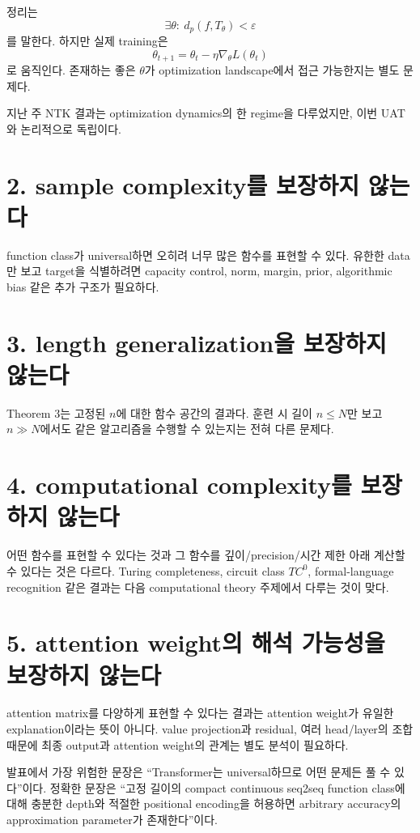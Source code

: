 \documentclass[11pt,a4paper,oneside,openany]{memoir}
\theoremstyle{definition}
\begin{document}
정리는
\[
\exists\theta:\ d_p(f,T_\theta)<\varepsilon
\]
를 말한다. 하지만 실제 training은
\[
\theta_{t+1}=\theta_t-\eta\nabla_\theta L(\theta_t)
\]
로 움직인다. 존재하는 좋은 $\theta$가 optimization landscape에서 접근 가능한지는 별도 문제다.

지난 주 NTK 결과는 optimization dynamics의 한 regime을 다루었지만, 이번 UAT와 논리적으로 독립이다.

\section{2. sample complexity를 보장하지 않는다}

function class가 universal하면 오히려 너무 많은 함수를 표현할 수 있다.
유한한 data만 보고 target을 식별하려면 capacity control, norm, margin, prior, algorithmic bias 같은 추가 구조가 필요하다.

\section{3. length generalization을 보장하지 않는다}

Theorem 3는 고정된 $n$에 대한 함수 공간의 결과다.
훈련 시 길이 $n\le N$만 보고 $n\gg N$에서도 같은 알고리즘을 수행할 수 있는지는 전혀 다른 문제다.

\section{4. computational complexity를 보장하지 않는다}

어떤 함수를 표현할 수 있다는 것과 그 함수를 깊이/precision/시간 제한 아래 계산할 수 있다는 것은 다르다.
Turing completeness, circuit class $TC^0$, formal-language recognition 같은 결과는 다음 computational theory 주제에서 다루는 것이 맞다.

\section{5. attention weight의 해석 가능성을 보장하지 않는다}

attention matrix를 다양하게 표현할 수 있다는 결과는 attention weight가 유일한 explanation이라는 뜻이 아니다.
value projection과 residual, 여러 head/layer의 조합 때문에 최종 output과 attention weight의 관계는 별도 분석이 필요하다.

\begin{warningbox}
발표에서 가장 위험한 문장은 ``Transformer는 universal하므로 어떤 문제든 풀 수 있다''이다.
정확한 문장은 ``고정 길이의 compact continuous seq2seq function class에 대해 충분한 depth와 적절한 positional encoding을 허용하면 arbitrary accuracy의 approximation parameter가 존재한다''이다.
\end{warningbox}
\end{document}
